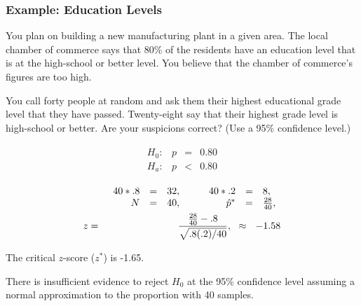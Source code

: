 \begin{frame}
  \frametitle{Example: Education Levels}

  \vspace*{-2em}
  You plan on building a new manufacturing plant in a given area. The
  local chamber of commerce says that 80\% of the residents have an
  education level that is at the high-school or better level. You
  believe that the chamber of commerce's figures are too high.

  You call forty people at random and ask them their highest
  educational grade level that they have passed. Twenty-eight say that
  their highest grade level is high-school or better. Are your
  suspicions correct? (Use a 95\% confidence level.)

  \vfill

  {
    \begin{eqnarray*}
      \begin{array}{lrcl}
        H_0: & p & = & 0.80 \\
        H_a: & p & < & 0.80
      \end{array}
    \end{eqnarray*}
  }

  {
    \begin{eqnarray*}
      & & 
      \begin{array}{rcl@{\hspace{3em}}rcl}
          40*.8 & = & 32, & 40*.2 & = & 8, \\
          N & = & 40, & \hat{p}^* & = & \frac{28}{40},
        \end{array} \\
      z & = & \frac{\frac{28}{40}-.8}{\sqrt{.8(.2)/40}}, ~~ \approx ~~ -1.58
    \end{eqnarray*}
  }
  

  {
    The critical $z$-score ($z^*$) is -1.65.
  }

  {

    {\color{red}
      There is insufficient evidence to reject $H_0$ at the 95\%
      confidence level assuming a normal approximation to the
      proportion with 40 samples.
    }

  }

  \vfill
  
\end{frame}


